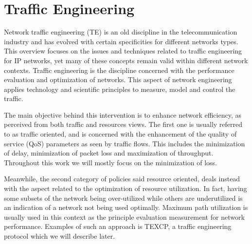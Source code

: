 \section{Traffic Engineering}

Network traffic engineering (TE) is an old discipline in the telecommunication industry and has evolved with certain specificities for different networks types. This overview focuses on the issues and techniques related to traffic engineering for IP networks, yet many of these concepts remain valid within different network contexts.
Traffic engineering is the discipline concerned with the performance evaluation  and optimization of  networks.  This aspect of network engineering applies technology and scientific principles to measure, model and control the traffic\cite {RFC3272}.  

The main objective behind this intervention is to enhance network efficiency, as perceived from both  traffic and resources views. The first one is usually referred to as traffic oriented, and is concerned with the enhancement of the quality of service (QoS) parameters as seen by traffic flows. This includes the minimization of delay, minimization of packet loss and maximization of throughput. Throughout this work we will mostly focus on the minimization of loss.

Meanwhile, the second category of policies said resource oriented,  deals instead with the aspect related to the optimization of resource utilization. In fact, having some subsets of the network being over-utilized while others are underutilized is an indication of a network not being used optimally. Maximum path utilization is usually used in this context as the principle evaluation measurement for network performance. Examples of such an approach is TEXCP\cite{texcp}, a traffic engineering protocol which we will describe later.

